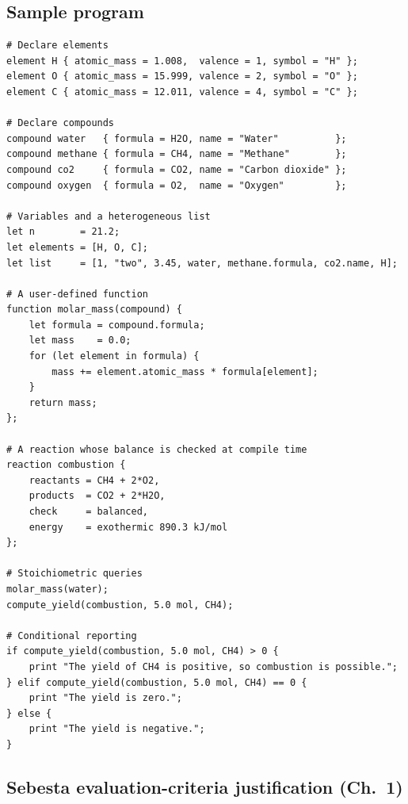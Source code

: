 \documentclass[11pt,a4paper]{article}
\begin{document}
\subsection{Sample program}
\begin{lstlisting}
# Declare elements
element H { atomic_mass = 1.008,  valence = 1, symbol = "H" };
element O { atomic_mass = 15.999, valence = 2, symbol = "O" };
element C { atomic_mass = 12.011, valence = 4, symbol = "C" };

# Declare compounds
compound water   { formula = H2O, name = "Water"          };
compound methane { formula = CH4, name = "Methane"        };
compound co2     { formula = CO2, name = "Carbon dioxide" };
compound oxygen  { formula = O2,  name = "Oxygen"         };

# Variables and a heterogeneous list
let n        = 21.2;
let elements = [H, O, C];
let list     = [1, "two", 3.45, water, methane.formula, co2.name, H];

# A user-defined function
function molar_mass(compound) {
    let formula = compound.formula;
    let mass    = 0.0;
    for (let element in formula) {
        mass += element.atomic_mass * formula[element];
    }
    return mass;
};

# A reaction whose balance is checked at compile time
reaction combustion {
    reactants = CH4 + 2*O2,
    products  = CO2 + 2*H2O,
    check     = balanced,
    energy    = exothermic 890.3 kJ/mol
};

# Stoichiometric queries
molar_mass(water);
compute_yield(combustion, 5.0 mol, CH4);

# Conditional reporting
if compute_yield(combustion, 5.0 mol, CH4) > 0 {
    print "The yield of CH4 is positive, so combustion is possible.";
} elif compute_yield(combustion, 5.0 mol, CH4) == 0 {
    print "The yield is zero.";
} else {
    print "The yield is negative.";
}
\end{lstlisting}

\subsection{Sebesta evaluation-criteria justification (Ch.~1)}
\end{document}
